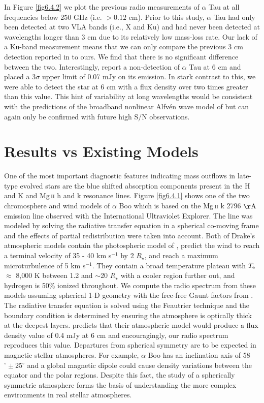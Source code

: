 In Figure \ref{fig6.4.2} we plot the previous  radio measurements of $\alpha$ Tau at all frequencies below 250 GHz (i.e. $> 0.12$ cm). Prior to this study, $\alpha$ Tau had only been detected at two VLA bands (i.e., X and Ku) and had never been detected at wavelengths longer than 3 cm due to its relatively low mass-loss rate. Our lack of a Ku-band measurement means that we can only compare the previous 3 cm detection reported in \cite{wood_2007} to ours. We find that there is no significant difference between the two. Interestingly, \cite{wood_2007} report a non-detection of $\alpha$ Tau at 6 cm and placed a 3$\sigma$ upper limit of 0.07 mJy on its emission. In stark contrast to this, we were able to detect the star at 6 cm with a flux density over two times greater than this value. This hint of variability at long wavelengths would be consistent with the predictions of the broadband nonlinear Alfv\'{e}n wave model of \cite{airapetian_2010} but can again only be confirmed with future high S/N observations.

\section{Results vs Existing Models}\label{sec:6.5}
One of the most important diagnostic features indicating mass outflows in late-type evolved stars are the blue shifted absorption components present in the  H and K and Mg\,\textsc{ii} h and k resonance lines. Figure \ref{fig6.4.1} shows one of the two chromosphere and wind models of $\alpha$ Boo \cite[`model A']{drake_1985} which is based on the Mg\,\textsc{ii} k 2796 $\rm{\AA}$ emission line observed with the International Ultraviolet Explorer. The line was modeled by solving the radiative transfer equation in a spherical co-moving frame and the effects of partial redistribution \citep[e.g.,][]{drake_1983b} were taken into account. Both of Drake's atmospheric models contain the photospheric model of \cite{ayres_1975}, predict the wind to reach a terminal velocity of 35 - 40 km s${}^{-1}$ by 2 $R _{\star}$, and reach a maximum microturbulence of 5 km s$^{-1}$. They contain a broad temperature plateau with $T_{\rm{e}}$ $\approx$ 8,000 K between 1.2 and $\sim$20 $R _{\star}$ with a cooler region further out, and hydrogen is 50\% ionized throughout. We compute the radio spectrum from these models assuming spherical 1-D geometry \citep{harper_1994} with the free-free Gaunt factors from \cite{hummer_1988}. The radiative transfer equation is solved using the Feautrier technique \citep{mihalas_1978} and the boundary condition is determined by ensuring the atmosphere is optically thick at the deepest layers. \cite{drake_1985} predicts that their atmospheric model would produce a flux density value of 0.4 mJy at 6 cm and encouragingly, our radio spectrum reproduces this value. Departures from spherical symmetry are to be expected in magnetic stellar atmospheres. For example, $\alpha$ Boo has an inclination axis of 58$^{\circ} \pm$25$^{\circ}$ \citep{gray_2006} and a global magnetic dipole could cause density variations between the equator and the polar regions. Despite this fact, the study of a  spherically symmetric atmosphere forms the basis of understanding the more complex environments in real stellar atmospheres.

